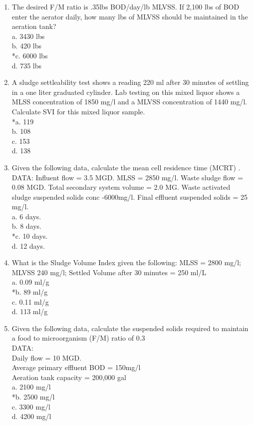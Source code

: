 \begin{enumerate}
\item The desired F/M ratio is .35lbs BOD/day/lb MLVSS.  If 2,100 lbs of BOD enter the aerator daily, how many lbs of MLVSS should be maintained in the aeration tank? \\
a. 3430 lbs \\
b. 420 lbs \\
*c. 6000 lbs \\
d. 735 lbs \\

\item A sludge settleability test shows a reading 220 ml after 30 minutes of settling in a one liter graduated cylinder. Lab testing on this mixed liquor shows a MLSS concentration of 1850 mg/l and a MLVSS concentration of 1440 mg/l. Calculate SVI for this mixed liquor sample. \\
*a. 119 \\
b. 108 \\
c. 153 \\
d. 138 \\

\item Given the following data, calculate the mean cell residence time (MCRT) . \\
DATA: Influent flow = 3.5 MGD. MLSS = 2850 mg/l. Waste sludge flow = 0.08 MGD. Total secondary system volume = 2.0 MG. Waste activated sludge suspended solids conc -6000mg/l. Final effluent suspended solids = 25 mg/l. \\
a. 6 days. \\
b. 8 days. \\
*c. 10 days. \\
d. 12 days. \\

\item What is the Sludge Volume Index given the following:  MLSS = 2800 mg/l; MLVSS 240 mg/l; Settled Volume after 30 minutes = 250 ml/L \\
a. 0.09 ml/g \\
*b. 89 ml/g \\
c. 0.11 ml/g \\
d. 113 ml/g \\

\item Given the following data, calculate the suspended solids required to maintain a food to microorganism (F/M) ratio of 0.3\\
DATA:\\
Daily flow = 10 MGD.\\
Average primary effluent BOD = 150mg/l\\
Aeration tank capacity = 200,000 gal \\
a. 2100 mg/l \\
*b. 2500 mg/l \\
c. 3300 mg/l \\
d. 4200 mg/l \\


\end{enumerate}
